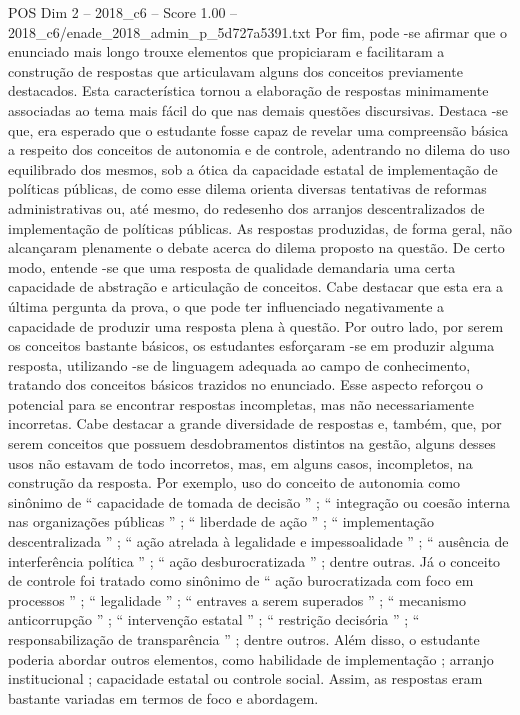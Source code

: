 \begin{textsample}{POS Dim 2 – 2018\_c6 – Score 1.00 – 2018\_c6/enade\_2018\_admin\_p\_5d727a5391.txt}
Por fim, pode -se afirmar que o enunciado mais longo trouxe elementos que propiciaram e facilitaram a construção de respostas que articulavam alguns dos conceitos previamente destacados.
Esta característica tornou a elaboração de respostas minimamente associadas ao tema mais fácil do que nas demais questões discursivas.
Destaca -se que, era esperado que o estudante fosse capaz de revelar uma compreensão básica a respeito dos conceitos de autonomia e de controle, adentrando no dilema do uso equilibrado dos mesmos, sob a ótica da capacidade estatal de implementação de políticas públicas, de como esse dilema orienta diversas tentativas de reformas administrativas ou, até mesmo, do redesenho dos arranjos descentralizados de implementação de políticas públicas.
As respostas produzidas, de forma geral, não alcançaram plenamente o debate acerca do dilema proposto na questão.
De certo modo, entende -se que uma resposta de qualidade demandaria uma certa capacidade de abstração e articulação de conceitos.
Cabe destacar que esta era a última pergunta da prova, o que pode ter influenciado negativamente a capacidade de produzir uma resposta plena à questão.
Por outro lado, por serem os conceitos bastante básicos, os estudantes esforçaram -se em produzir alguma resposta, utilizando -se de linguagem adequada ao campo de conhecimento, tratando dos conceitos básicos trazidos no enunciado.
Esse aspecto reforçou o potencial para se encontrar respostas incompletas, mas não necessariamente incorretas.
Cabe destacar a grande diversidade de respostas e, também, que, por serem conceitos que possuem desdobramentos distintos na gestão, alguns desses usos não estavam de todo incorretos, mas, em alguns casos, incompletos, na construção da resposta.
Por exemplo, uso do conceito de autonomia como sinônimo de “ capacidade de tomada de decisão ” ; “ integração ou coesão interna nas organizações públicas ” ; “ liberdade de ação ” ; “ implementação descentralizada ” ; “ ação atrelada à legalidade e impessoalidade ” ; “ ausência de interferência política ” ; “ ação desburocratizada ” ; dentre outras.
Já o conceito de controle foi tratado como sinônimo de “ ação burocratizada com foco em processos ” ; “ legalidade ” ; “ entraves a serem superados ” ; “ mecanismo anticorrupção ” ; “ intervenção estatal ” ; “ restrição decisória ” ; “ responsabilização de transparência ” ; dentre outros.
Além disso, o estudante poderia abordar outros elementos, como habilidade de implementação ; arranjo institucional ; capacidade estatal ou controle social.
Assim, as respostas eram bastante variadas em termos de foco e abordagem.

\end{textsample}
